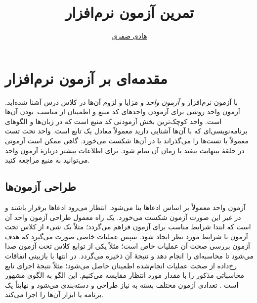 \documentclass{utap}
\title{تمرین آزمون نرم‌افزار}
\author{\href{mailto:hadi.safari@ut.ac.ir?subject=[AP\%20S98 AT]\%20}{هادی صفری}}
\begin{document}
    \maketitle

    \section{مقدمه‌ای بر آزمون نرم‌افزار}

    با آزمون نرم‌افزار و \textit{آزمون واحد} و مزایا و لزوم آن‌ها در کلاس درس آشنا شده‌اید. آزمون واحد روشی  برای آزمودن واحدهای کد منبع و اطمینان از مناسب~بودن آن‌ها است. واحد کوچک‌ترین بخش آزمودنی کد منبع است که در زبان‌ها و الگوهای برنامه‌نویسی‌ای که با آن‌ها آشنایی دارید معمولاً معادل یک تابع است.
    واحد تحت تست معمولاً یا تست‌ها را می‌گذراند یا در آن‌ها شکست می‌خورد. گاهی ممکن است آزمونی در حلقهٔ بینهایت بیفتد یا زمان آن تمام شود.
    برای اطلاعات بیشتر دربارهٔ آزمون واحد می‌توانید به منبع \cite{wikibooks18} مراجعه کنید.

    \subsection{طراحی آزمون‌ها}

    آزمون واحد معمولاً بر اساس ادعاها بنا می‌شود. انتظار می‌رود ادعاها برقرار باشند و در غیر این صورت آزمون شکست می‌خورد.
    یک راه معمول طراحی آزمون واحد آن است که ابتدا شرایط مناسب برای آزمون فراهم می‌گردد؛ مثلاً یک شیء از کلاس تحت آزمون با شرایط مورد نظر ایجاد شود. سپس عملیات خاصی صورت می‌گیرد که هدف آزمون بررسی صحت آن عملیات خاص است؛ مثلاً یکی از توابع کلاس تحت آزمون صدا می‌شود تا محاسبه‌ای را انجام دهد و نتیجهٔ آن ذخیره می‌گردد. در انتها با بازبینی اتفاقات رخ‌داده از صحت عملیات انجام‌شده اطمینان حاصل می‌شود؛ مثلاً نتیجهٔ اجرای تابع محاسباتی مذکور را با مقدار مورد انتظار مقایسه می‌کنیم. این الگو به الگوی  مشهور است \cite{dietrich14,vocke18}. تعدادی آزمون مختلف بسته به نیاز طراحی و دسته‌بندی می‌شود و نهایتاً یک برنامه یا ابزار آن‌ها را اجرا می‌کند.
\end{document}
